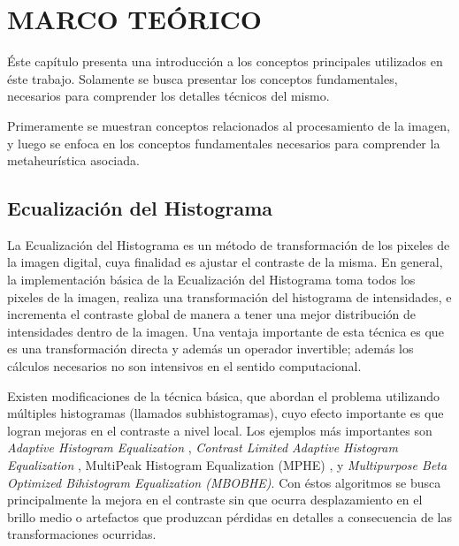 \chapter{MARCO TEÓRICO}\label{sec:theorethical_framework}

Éste capítulo presenta una introducción a los conceptos principales utilizados en éste trabajo. Solamente se busca presentar los conceptos fundamentales, necesarios para comprender los detalles técnicos del mismo.

Primeramente se muestran conceptos relacionados al procesamiento de la imagen, y luego se enfoca en los conceptos fundamentales necesarios para comprender la metaheurística asociada.

\section{Ecualización del Histograma}

La Ecualización del Histograma es un método de transformación de los pixeles de la imagen digital, cuya finalidad es ajustar el contraste de la misma. En general, la implementación básica de la Ecualización del Histograma toma todos los pixeles de la imagen, realiza una transformación del histograma de intensidades, e incrementa el contraste global de manera a tener una mejor distribución de intensidades dentro de la imagen. Una ventaja importante de esta técnica es que es una transformación directa y además un operador invertible; además los cálculos necesarios no son intensivos en el sentido computacional.

Existen modificaciones de la técnica básica, que abordan el problema utilizando múltiples histogramas (llamados subhistogramas), cuyo efecto importante es que logran mejoras en el contraste a nivel local. Los ejemplos más importantes son \textit{Adaptive Histogram Equalization} \cite{pizer1987adaptive}, \textit{Contrast Limited Adaptive Histogram Equalization} \cite{zuiderveld1994contrast}, MultiPeak Histogram Equalization (MPHE) \cite{743808}, y \textit{Multipurpose Beta Optimized Bihistogram Equalization (MBOBHE)}. Con éstos algoritmos se busca principalmente la mejora en el contraste sin que ocurra desplazamiento en el brillo medio o artefactos que produzcan pérdidas en detalles a consecuencia de las transformaciones ocurridas.

